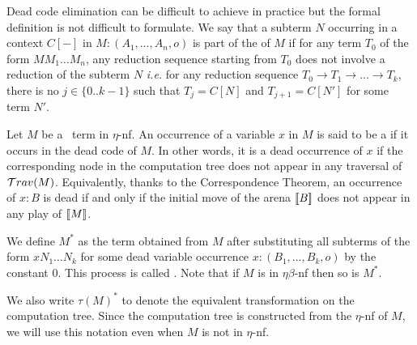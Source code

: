 Dead code elimination can be difficult to achieve in practice but the formal definition is not difficult to formulate. We say that a subterm $N$ occurring
in a context $C[-]$ in $M : (A_1, \ldots, A_n,o)$ is part of the  of $M$ if for any term $T_0$ of the form $M M_1 \ldots M_n$,
any reduction sequence starting from $T_0$ does not involve a reduction of the subterm $N$ {\it i.e.} for any reduction sequence $T_0 \rightarrow T_1 \rightarrow \ldots \rightarrow T_k$, there is no $j\in \{0.. k-1\}$ such that $T_j = C[N]$ and $T_{j+1} = C[N']$ for some term $N'$.


Let $M$  be a \pcf\ term in $\eta$-nf.
An occurrence of a variable $x$ in $M$ is said to be a 
if it occurs in the dead code of $M$. In other words, it is a
dead occurrence of $x$ if the corresponding node in the computation tree does not appear in any traversal of $\mathcal{T}rav(M)$. Equivalently, thanks to the Correspondence Theorem, an occurrence of $x:B$ is dead if and only if the initial move
of the arena ${[\![ B ]\!]}$ does not appear in any play of ${[\![ M ]\!]}$.


We define $M^*$ as the term obtained from $M$ after substituting all subterms of the form  $x N_1 \dots N_k$ for some dead variable occurrence $x:(B_1,\ldots, B_k, o)$ by the constant $0$. This process is called .
Note that if $M$ is in $\eta\beta$-nf then so is $M^*$.

We also write $\tau(M)^*$ to denote the equivalent transformation on the computation tree. Since the computation tree is constructed from the $\eta$-nf of $M$, we will use this notation even when $M$ is not in $\eta$-nf.



